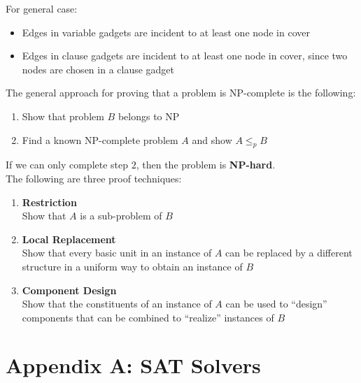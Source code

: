 \documentclass{article}
\begin{document}
For general case:
\begin{itemize}
    \item Edges in variable gadgets are incident to at least one node in cover
    \item Edges in clause gadgets are incident to at least one node in cover, since two nodes are chosen in a clause gadget
\end{itemize}
The general approach for proving that a problem is NP-complete is the following:
\begin{enumerate}
    \item Show that problem $B$ belongs to NP
    \item Find a known NP-complete problem $A$ and show $A \leq_p B$
\end{enumerate}
If we can only complete step $2$, then the problem is \textbf{NP-hard}. \\
The following are three proof techniques:
\begin{enumerate}
    \item \textbf{Restriction}
        \vspace{0.2cm} \\
        Show that $A$ is a sub-problem of $B$ 
    \item \textbf{Local Replacement}
        \vspace{0.2cm} \\
        Show that every basic unit in an instance of $A$ can be replaced by a different structure in a uniform way to obtain an instance of $B$
    \item \textbf{Component Design}
        \vspace{0.2cm} \\
        Show that the constituents of an instance of $A$ can be used to “design” components that can be combined to “realize” instances of $B$
\end{enumerate}

\newpage

\section{Appendix A: SAT Solvers}
\end{document}
